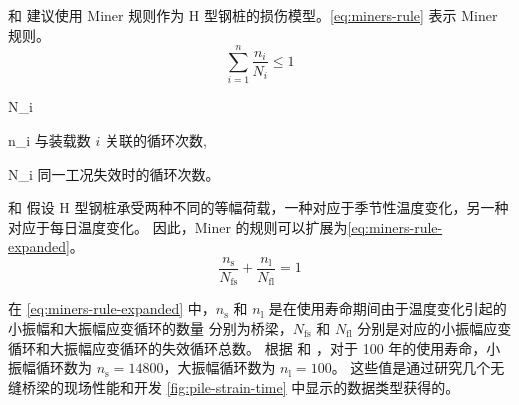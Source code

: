  和   建议使用 Miner 规则作为 H 型钢桩的损伤模型。\cref{eq:miners-rule} 表示 Miner 规则。
\begin{equation}
  \label{eq:miners-rule}
  \sum \limits_{i=1}^n \frac{n_i}{N_i} \leqslant 1
\end{equation}
\begin{EqDesc}{N_i}
  \item[n_i] 与装载数 $i$ 关联的循环次数,
  \item[N_i] 同一工况失效时的循环次数。
\end{EqDesc}

 和   假设 H 型钢桩承受两种不同的等幅荷载，一种对应于季节性温度变化，另一种对应于每日温度变化。 因此，Miner 的规则可以扩展为\cref{eq:miners-rule-expanded}。
\begin{equation}
  \label{eq:miners-rule-expanded}
  \frac{n_\text{s}}{N_\text{fs}}+\frac{n_\text{l}}{N_\text{fl}}=1
\end{equation}

在 \cref{eq:miners-rule-expanded} 中，$n_\text{s}$ 和 $n_\text{l}$ 是在使用寿命期间由于温度变化引起的小振幅和大振幅应变循环的数量 分别为桥梁，$N_\text{fs}$ 和 $N_\text{fl}$ 分别是对应的小振幅应变循环和大振幅应变循环的失效循环总数。 根据  和  ，对于 100 年的使用寿命，小振幅循环数为 $n_\text{s}=14800$，大振幅循环数为 $n_\text{l}= 100$。 这些值是通过研究几个无缝桥梁的现场性能和开发 \cref{fig:pile-strain-time} 中显示的数据类型获得的。

